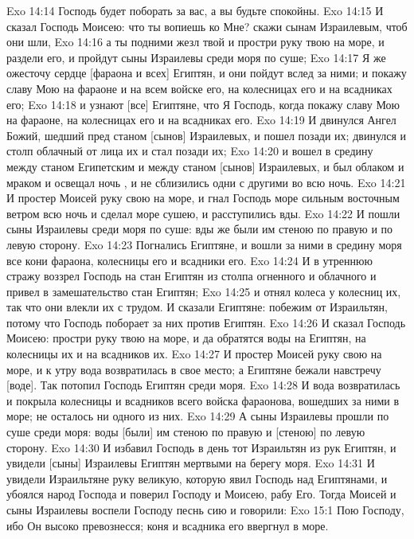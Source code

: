 \vs Exo 14:14 Господь будет поборать за вас, а вы будьте спокойны.
\rsbpar\vs Exo 14:15 И сказал Господь Моисею: что ты вопиешь ко Мне? скажи сынам Израилевым, чтоб они шли,
\vs Exo 14:16 а ты подними жезл твой и простри руку твою на море, и раздели его, и пройдут сыны Израилевы среди моря по суше;
\vs Exo 14:17 Я же ожесточу сердце [фараона и всех] Египтян, и они пойдут вслед за ними; и покажу славу Мою на фараоне и на всем войске его, на колесницах его и на всадниках его;
\vs Exo 14:18 и узнают [все] Египтяне, что Я Господь, когда покажу славу Мою на фараоне, на колесницах его и на всадниках его.
\rsbpar\vs Exo 14:19 И двинулся Ангел Божий, шедший пред станом [сынов] Израилевых, и пошел позади их; двинулся и столп облачный от лица их и стал позади их;
\vs Exo 14:20 и вошел в средину между станом Египетским и между станом [сынов] Израилевых, и был облаком и мраком  и освещал ночь , и не сблизились одни с другими во всю ночь.
\vs Exo 14:21 И простер Моисей руку свою на море, и гнал Господь море сильным восточным ветром всю ночь и сделал море сушею, и расступились вды.
\vs Exo 14:22 И пошли сыны Израилевы среди моря по суше: вды же были им стеною по правую и по левую сторону.
\vs Exo 14:23 Погнались Египтяне, и вошли за ними в средину моря все кони фараона, колесницы его и всадники его.
\rsbpar\vs Exo 14:24 И в утреннюю стражу воззрел Господь на стан Египтян из столпа огненного и облачного и привел в замешательство стан Египтян;
\vs Exo 14:25 и отнял колеса у колесниц их, так что они влекли их с трудом. И сказали Египтяне: побежим от Израильтян, потому что Господь поборает за них против Египтян.
\vs Exo 14:26 И сказал Господь Моисею: простри руку твою на море, и да обратятся воды на Египтян, на колесницы их и на всадников их.
\vs Exo 14:27 И простер Моисей руку свою на море, и к утру вода возвратилась в свое место; а Египтяне бежали навстречу [воде]. Так потопил Господь Египтян среди моря.
\vs Exo 14:28 И вода возвратилась и покрыла колесницы и всадников всего войска фараонова, вошедших за ними в море; не осталось ни одного из них.
\vs Exo 14:29 А сыны Израилевы прошли по суше среди моря: воды [были] им стеною по правую и [стеною] по левую сторону.
\vs Exo 14:30 И избавил Господь в день тот Израильтян из рук Египтян, и увидели [сыны] Израилевы Египтян мертвыми на берегу моря.
\vs Exo 14:31 И увидели Израильтяне руку великую, которую явил Господь над Египтянами, и убоялся народ Господа и поверил Господу и Моисею, рабу Его. Тогда Моисей и сыны Израилевы воспели Господу песнь сию и говорили:
\vs Exo 15:1 Пою Господу, ибо Он высоко превознесся; коня и всадника его ввергнул в море.
